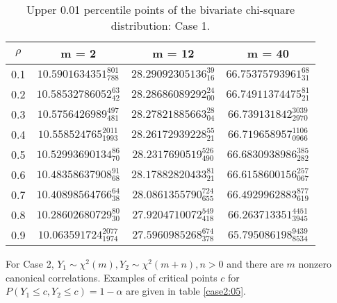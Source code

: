 \documentclass[10pt,letterpaper]{article}
\begin{document}
\begin{table}[ht]
\caption{Upper 0.01 percentile points of the bivariate chi-square distribution:
Case 1.}
\label{case1:01}
\begin{center}
\begin{tabular}{cccc} \hline
$\rho$ & m = 2 & m = 12 & m = 40 \\ \hline
0.1  & $ 10.5901634351_{788}^{801} $ & $ 28.29092305136_{16}^{39}  $ & $ 66.75375793961_{31}^{68} $ \\
0.2  & $ 10.58532786052_{42}^{63} $ & $ 28.28686089292_{00}^{24}  $ & $ 66.74911374475_{21}^{81} $ \\
0.3  & $ 10.5756426989_{481}^{497} $ & $ 28.27821885663_{04}^{28}  $ & $ 66.739131842_{2970}^{3039} $ \\
0.4  & $ 10.558524765_{1993}^{2011} $ & $ 28.26172939228_{21}^{55}  $ & $ 66.719658957_{0966}^{1106} $ \\
0.5  & $ 10.52993690134_{70}^{86} $ & $ 28.2317690519_{490}^{526} $ & $ 66.6830938986_{282}^{385} $ \\
0.6  & $ 10.48358637908_{68}^{91} $ & $ 28.17882820433_{21}^{81}  $ & $ 66.6158600156_{067}^{257} $ \\
0.7  & $ 10.40898564766_{38}^{64} $ & $ 28.0861355790_{655}^{724} $ & $ 66.4929962883_{619}^{877} $ \\
0.8  & $ 10.28602680729_{30}^{80} $ & $ 27.9204710072_{418}^{549} $ & $ 66.263713351_{3945}^{4451} $ \\
0.9  & $ 10.063591724_{1974}^{2077} $ & $ 27.5960985268_{378}^{674} $ & $
65.795086198_{8534}^{9439} $ \\ \hline
\end{tabular}
\end{center}
\end{table}
\renewcommand{\arraystretch}{1}
For Case 2, $Y_1 \sim \chi^2(m), Y_2 \sim \chi^2(m+n), n > 0$ and
there are $m$ nonzero canonical correlations.
Examples of critical points $c$ for $P(Y_1 \leq c, Y_2 \leq c) = 1- \alpha$
are given in table \ref{case2:05}.
\renewcommand{\arraystretch}{1.3}
\end{document}
